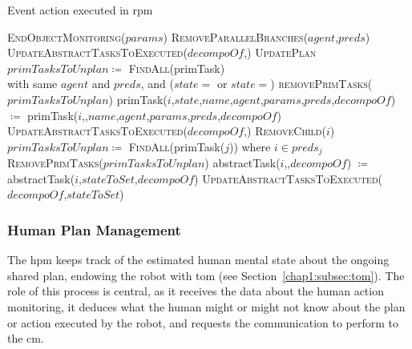 \documentclass[a4paper,11pt,twoside]{StyleThese}
\begin{document}
\begin{algorithm}[!htb]
	\caption{Event action executed in \acrshort{rpm}}
	\label{chap2:algo:executed}
	\begin{algorithmic}
		\State \textsc{EndObjectMonitoring($params$)}
		\State \textsc{RemoveParallelBranches($agent$,$preds$)}
		\State \textsc{UpdateAbstractTasksToExecuted($decompoOf$,)}
		\State \textsc{UpdatePlan} 
	\EndFunction
	\Statex
		\State $primTasksToUnplan \coloneqq$ \textsc{FindAll}(primTask) 
		\\\hfill with same $agent$ and $preds$, and ($state=$ or $state=$) 
		\State \textsc{removePrimTasks}($primTasksToUnplan$)
	\EndFunction
	\Statex
			\State primTask($i$,$state$,$name$,$agent$,$params$,$preds$,$decompoOf$) 
			\\\hfill $\coloneqq$ primTask($i$,,$name$,$agent$,$params$,$preds$,$decompoOf$)
			\State \textsc{UpdateAbstractTasksToExecuted($decompoOf$,)}
			\State \textsc{RemoveChild($i$)}
		\EndFor
	\EndFunction
	\Statex
		\State $primTasksToUnplan \coloneqq$ \textsc{FindAll}(primTask($j$)) where $i \in preds_j$ 
		\State \textsc{RemovePrimTasks}($primTasksToUnplan$)
	\EndFunction
	\Statex
			\State abstractTask($i$,,$decompoOf$) $\coloneqq$ abstractTask($i$,$stateToSet$,$decompoOf$)
			\State \textsc{UpdateAbstractTasksToExecuted($decompoOf$,$stateToSet$)}
		\EndIf
	\EndFunction	
	\end{algorithmic}
\end{algorithm}		

\clearpage
\subsubsection{Human Plan Management}\label{chap2:subsubsec:human_plan}
The \acrfull{hpm} keeps track of the estimated human mental state about the ongoing shared plan, endowing the robot with \acrlong{tom} (see Section~\ref{chap1:subsec:tom}). The role of this process is central, as it receives the data about the human action monitoring, it deduces what the human might or might not know about the plan or action executed by the robot, and requests the communication to perform to the \acrfull{cm}. 
\end{document}
